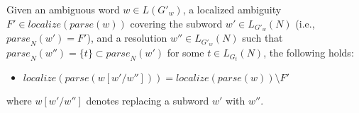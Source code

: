 \documentclass[acmsmall,review,anonymous]{acmart}\settopmatter{printfolios=true,printccs=false,printacmref=false}
\newcommand{\T}{\Sigma} %
\newcommand{\yield}{\mathit{yield}} %
\newcommand{\parse}{\mathit{parse}} %
\newcommand{\localize}{\mathit{localize}} %
\begin{document}
\begin{theorem}
  Given an ambiguous word $w \in L(G'_w)$, a localized ambiguity $F' \in \localize(\parse(w))$ covering the subword $w' \in L_{G'_w}(N)$ (i.e., $\parse_N(w') = F'$), and a resolution $w'' \in L_{G'_w}(N)$ such that $\parse_N(w'') = \{t\} \subset \parse_N(w')$ for some $t \in L_{G_t}(N)$, the following holds:
  \begin{itemize}
  \item $\localize(\parse(w[w'/w''])) = \localize(\parse(w)) \setminus F'$
  \end{itemize}
  where $w[w'/w'']$ denotes replacing a subword $w'$ with $w''$.
\end{theorem}














\end{document}
